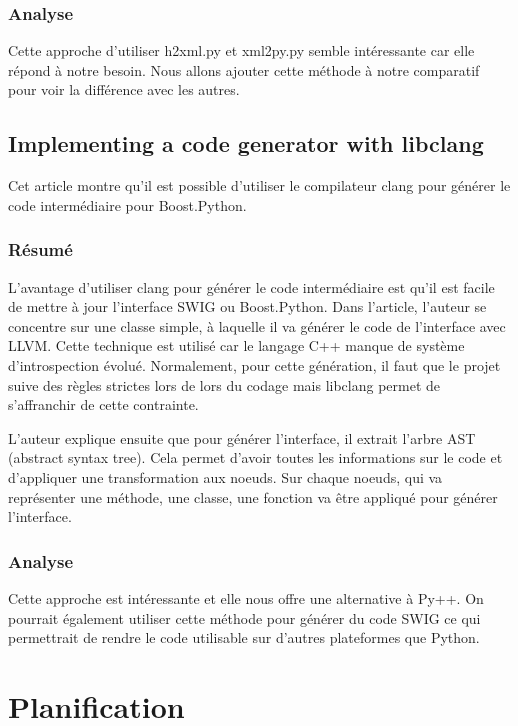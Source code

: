 \documentclass[11pt, french, screen]{report-rd-info}
\begin{document}
\subsection{Analyse}

Cette approche d'utiliser h2xml.py et xml2py.py semble intéressante car elle répond à notre besoin. Nous allons ajouter cette méthode à notre comparatif pour voir la différence avec les autres.

\section{Implementing a code generator with libclang}

Cet article \cite{2014IACGWLTamas} montre qu'il est possible d'utiliser le compilateur clang pour générer le code intermédiaire pour Boost.Python.

\subsection{Résumé}

L'avantage d'utiliser clang pour générer le code intermédiaire est qu'il est facile de mettre à jour l'interface SWIG ou Boost.Python. Dans l'article, l'auteur se concentre sur une classe simple, à laquelle il va générer le code de l'interface avec LLVM. Cette technique est utilisé car le langage C++ manque de système d'introspection évolué. Normalement, pour cette génération, il faut que le projet suive des règles strictes lors de lors du codage mais libclang permet de s'affranchir de cette contrainte. 

L'auteur explique ensuite que pour générer l'interface, il extrait l'arbre AST (abstract syntax tree). Cela permet d'avoir toutes les informations sur le code et d'appliquer une transformation aux noeuds. Sur chaque noeuds, qui va représenter une méthode, une classe, une fonction va être appliqué pour générer l'interface.

\subsection{Analyse}

Cette approche est intéressante et elle nous offre une alternative à Py++. On pourrait également utiliser cette méthode pour générer du code SWIG ce qui permettrait de rendre le code utilisable sur d'autres plateformes que Python.

\chapter{Planification}
\end{document}
